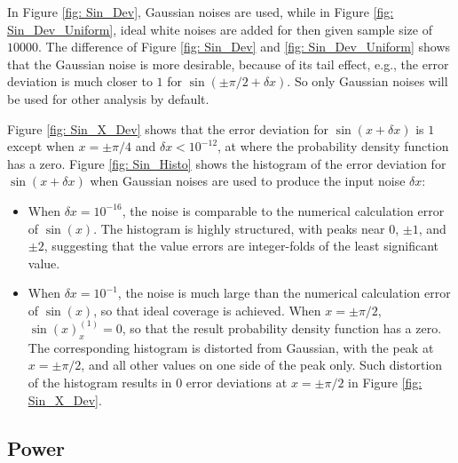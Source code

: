 \documentclass[twoside]{article}
\numberwithin{equation}{section}
\begin{document}
In Figure \ref{fig: Sin_Dev}, Gaussian noises are used, while in Figure \ref{fig: Sin_Dev_Uniform}, ideal white noises are added for then given sample size of $10000$.
The difference of Figure \ref{fig: Sin_Dev} and \ref{fig: Sin_Dev_Uniform} shows that the Gaussian noise is more desirable, because of its tail effect, e.g., the error deviation is much closer to $1$ for $\sin(\pm \pi/2 + \delta x)$.
So only Gaussian noises will be used for other analysis by default.

Figure \ref{fig: Sin_X_Dev} shows that the error deviation for $\sin(x + \delta x)$ is $1$ except when $x=\pm \pi/4$ and $\delta x < 10^{-12}$, at where the probability density function has a zero.
Figure \ref{fig: Sin_Histo} shows the histogram of the error deviation for $\sin(x + \delta x)$ when Gaussian noises are used to produce the input noise $\delta x$:
\begin{itemize}
\item When $\delta x=10^{-16}$, the noise is comparable to the numerical calculation error of $\sin(x)$.
The histogram is highly structured, with peaks near $0$, $\pm 1$, and $\pm 2$, suggesting that the value errors are integer-folds of the least significant value.

\item When $\delta x=10^{-1}$, the noise is much large than the numerical calculation error of $\sin(x)$, so that ideal coverage is achieved.
When $x=\pm \pi/2$, $\sin(x)^{(1)}_{x} = 0$, so that the result probability density function has a zero.
The corresponding histogram is distorted from Gaussian, with the peak at $x=\pm \pi/2$, and all other values on one side of the peak only.
Such distortion of the histogram results in $0$ error deviations at $x=\pm \pi/2$ in Figure \ref{fig: Sin_X_Dev}.
\end{itemize}


\subsection{Power}
\end{document}
